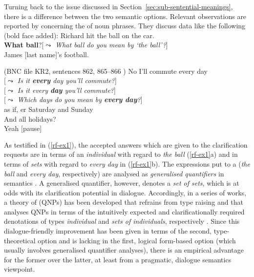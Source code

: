 \documentclass[output=paper
 	        ,biblatex
                ,babelshorthands
                ,newtxmath
                ,draftmode
                ,colorlinks, citecolor=brown
]{langscibook}
\begin{document}
Turning back to the issue discussed in Section~\ref{sec:sub-sentential-meanings}, there is a difference between the two semantic options.
%
Relevant observations are reported by \citet{Purver:Ginzburg:2004} concerning the  of noun phrases.
%
They discuss data like the following (bold face added):
%
\ea \label{rf-ex1}
  \ea  {} Richard hit the ball on the car. \\
 \textbf{What ball}?\hspace*{0.25cm}[\emph{$\leadsto$ What ball do you mean by  `the ball'?}] \\
 James [last name]'s football. \par\smallskip
\hfill (BNC file KR2, sentences 862, 865--866 )
  \ex {} No I'll commute every day \\
 [\emph{$\leadsto$ Is it \textbf{every} day you'll commute?}]\\
 [\emph{$\leadsto$ Is it every \textbf{day} you'll commute?}]\\
 [\emph{$\leadsto$ Which days do you mean by \textbf{every day}?}]\\
 as if, er Saturday and Sunday \\
 And all holidays? \\
 Yeah [pause]
  \z
\z

As testified in (\ref{rf-ex1}), the accepted answers which are given to the clarification requests are in terms of an \emph{individual} with regard to \textit{the ball} (\ref{rf-ex1}a) and in terms of \emph{sets} with regard to \textit{every day} in (\ref{rf-ex1}b).
%
The expressions put to a  (\textit{the ball} and \textit{every day}, respectively) are analysed as \emph{generalised quantifiers}  in semantics \citep{montague73}.
%
A generalised quantifier, however, denotes a \emph{set of sets}, which is at odds with its clarification potential in dialogue. 
%
Accordingly, in a series of works, a theory of  (QNPs) has been developed that refrains from type raising and that analyses QNPs in terms of the intuitively expected and clarificationally required denotations of types \emph{individual} and \emph{sets of individuals}, respectively  \citep{Purver:Ginzburg:2004,Ginzburg:Purver:2012,Ginzburg:2012,Cooper:2013,Luecking:Ginzburg:2018,Cooper:ms}. 
%
Since this dialogue-friendly improvement has been given in terms of the second, type-theoretical option and is lacking in the first, logical form-based option (which usually involves generalised quantifier analyses), there is an empirical advantage for the former over the latter, at least from a pragmatic, dialogue semantics viewpoint.
\end{document}

